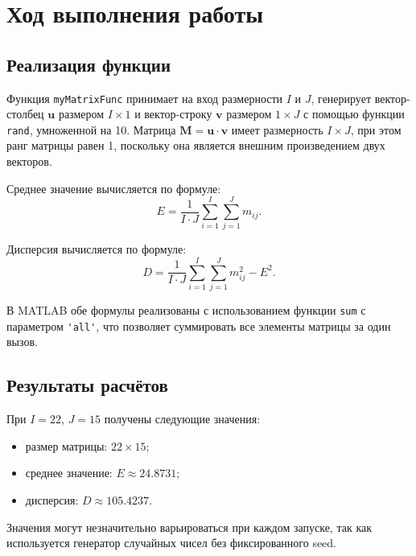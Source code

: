 \section{Ход выполнения работы}
\label{sec:work2}

\subsection{Реализация функции}
\label{subsec:func2}

    Функция \verb|myMatrixFunc| принимает на вход размерности $I$ и $J$, генерирует вектор-столбец $\mathbf{u}$ размером $I \times 1$ и вектор-строку $\mathbf{v}$ размером $1 \times J$ с помощью функции \verb|rand|, умноженной на 10. Матрица $\mathbf{M} = \mathbf{u} \cdot \mathbf{v}$ имеет размерность $I \times J$, при этом ранг матрицы равен 1, поскольку она является внешним произведением двух векторов.

    Среднее значение вычисляется по формуле:
    \begin{equation}
    \label{eq:mean}
        E = \frac{1}{I \cdot J} \sum_{i=1}^{I} \sum_{j=1}^{J} m_{ij}.
    \end{equation}

    Дисперсия вычисляется по формуле:
    \begin{equation}
    \label{eq:var}
        D = \frac{1}{I \cdot J} \sum_{i=1}^{I} \sum_{j=1}^{J} m_{ij}^2 - E^2.
    \end{equation}

    В MATLAB обе формулы реализованы с использованием функции \verb|sum| с параметром \verb|'all'|, что позволяет суммировать все элементы матрицы за один вызов.

\subsection{Результаты расчётов}
\label{subsec:res2}

    При $I = 22$, $J = 15$ получены следующие значения:
    \begin{itemize}
        \item размер матрицы: $22 \times 15$;
        \item среднее значение: $E \approx 24.8731$;
        \item дисперсия: $D \approx 105.4237$.
    \end{itemize}

    Значения могут незначительно варьироваться при каждом запуске, так как используется генератор случайных чисел без фиксированного seed.

